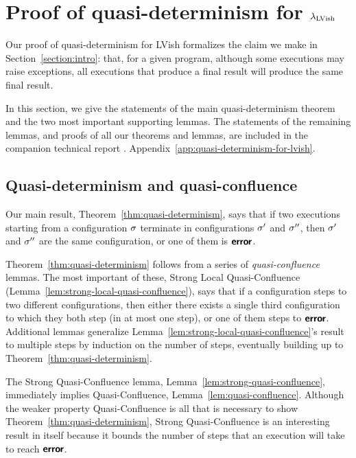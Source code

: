 \section{Proof of quasi-determinism for $\lambda_{\textrm{LVish}}$}\label{s:quasi-proof}


Our proof of quasi-determinism for LVish formalizes the claim we make
in Section~\ref{section:intro}: that, for a given program, although
some executions may raise exceptions, all executions that produce a
final result will produce the same final result.

In this section, we give the statements of the main
quasi-determinism theorem and the two most important supporting
lemmas.  The statements of the remaining lemmas,
and proofs of all our theorems and lemmas,
are included in
\ifx\fulltr\undefined
the companion
technical report \cite{Freeze-TR}.
\else
Appendix~\ref{app:quasi-determinism-for-lvish}.
\fi

\subsection{Quasi-determinism and quasi-confluence}

Our main result, Theorem~\ref{thm:quasi-determinism}, says that if two
executions starting from a configuration $\sigma$ terminate in
configurations $\sigma'$ and $\sigma''$, then $\sigma'$ and $\sigma''$ are
the same configuration, or one of them is $\textbf{\textsf{error}}$.

\ThmQuasiDeterminism

\noindent Theorem~\ref{thm:quasi-determinism} follows from a series of
\emph{quasi-confluence} lemmas.  The most important of these,
Strong Local Quasi-Confluence (Lemma~\ref{lem:strong-local-quasi-confluence}), says that if a
configuration steps to two different configurations, then either there
exists a single third configuration to which they both step (in at
most one step), or one of them steps to $\textbf{\textsf{error}}$.
Additional lemmas generalize Lemma~\ref{lem:strong-local-quasi-confluence}'s result to multiple
steps by induction on the number of steps, eventually building up to Theorem~\ref{thm:quasi-determinism}.

\LemStrongLocalQuasiConfluence

\noindent The Strong Quasi-Confluence lemma,
Lemma~\ref{lem:strong-quasi-confluence}, immediately implies
Quasi-Confluence, Lemma~\ref{lem:quasi-confluence}.  Although the
weaker property Quasi-Confluence is all that is necessary to show
Theorem~\ref{thm:quasi-determinism}, Strong Quasi-Confluence is an
interesting result in itself because it bounds the number of steps
that an execution will take to reach $\textbf{\textsf{error}}$.
\fi

